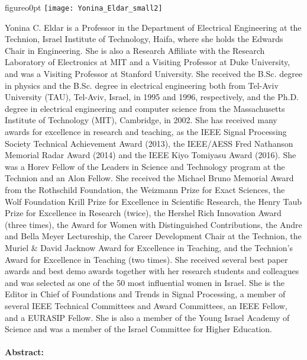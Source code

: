 \begin{wrapfloat}{figure}{o}{0pt}
\texttt{[image: Yonina\_Eldar\_small2]}
\end{wrapfloat}
Yonina C. Eldar is a Professor in the Department of Electrical Engineering at the Technion, Israel Institute of Technology, Haifa, where she holds the Edwards Chair in Engineering. 
She is also a Research Affiliate with the Research Laboratory of Electronics at MIT and a Visiting Professor at Duke University, and was a Visiting Professor at Stanford University. 
She received the B.Sc. degree in physics and the B.Sc. degree in electrical engineering both from Tel-Aviv University (TAU), Tel-Aviv, Israel, in 1995 and 1996, respectively, and the Ph.D. degree in electrical engineering and computer science from the Massachusetts Institute of Technology (MIT), Cambridge, in 2002.
She has received many awards for excellence in research and teaching, as
the IEEE Signal Processing Society Technical Achievement Award (2013), the IEEE/AESS Fred Nathanson Memorial Radar Award (2014) and the IEEE Kiyo Tomiyasu Award (2016).
She was a Horev Fellow of the Leaders in Science and Technology program at the Technion and an Alon Fellow. 
She received the Michael Bruno Memorial Award from the Rothschild Foundation, the Weizmann Prize for Exact Sciences, the Wolf Foundation Krill Prize for Excellence in Scientific Research, the Henry Taub Prize for Excellence in Research (twice), the Hershel Rich Innovation Award (three times), the Award for Women with Distinguished Contributions, the Andre and Bella Meyer Lectureship, the Career Development Chair at the Technion, the Muriel \& David Jacknow Award for Excellence in Teaching, and the Technion's Award for Excellence in Teaching (two times). 
She received several best paper awards and best demo awards together with her research students and colleagues and was selected as one of the 50 most influential women in Israel.
She is the Editor in Chief of Foundations and Trends in Signal Processing, a member of several IEEE Technical Committees and Award Committees, an IEEE Fellow, and a EURASIP Fellow.
She is also a member of the Young Israel Academy of Science and was a member of the Israel Committee for Higher Education.\\\\
\textbf{Abstract:}\\
